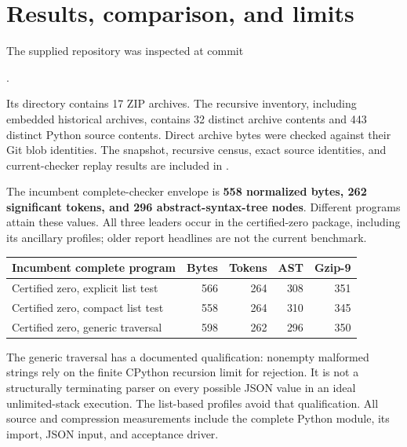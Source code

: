 \section{Results, comparison, and limits}
\label{sec:scope}

The supplied repository was inspected at commit
\begin{center}\small{}.\end{center}
Its  directory contains 17 ZIP archives. The recursive
inventory, including embedded historical archives, contains 32 distinct
archive contents and 443 distinct Python source contents. Direct archive
bytes were checked against their Git blob identities. The snapshot,
recursive census, exact source identities, and current-checker replay
results are included in .\cite{snapshot}

The incumbent complete-checker envelope is \textbf{558 normalized bytes,
262 significant tokens, and 296 abstract-syntax-tree nodes}. Different
programs attain these values. All three leaders occur in the
certified-zero package, including its ancillary profiles; older report
headlines are not the current benchmark.\cite{certified}

\begin{center}\small
\begin{tabular}{lrrrr}
\toprule
Incumbent complete program & Bytes & Tokens & AST & Gzip-9\\
\midrule
Certified zero, explicit list test &566&264&308&351\\
Certified zero, compact list test &558&264&310&345\\
Certified zero, generic traversal &598&262&296&350\\
\bottomrule
\end{tabular}
\end{center}

The generic traversal has a documented qualification: nonempty malformed
strings rely on the finite CPython recursion limit for rejection. It is
not a structurally terminating parser on every possible JSON value in an
ideal unlimited-stack execution. The list-based profiles avoid that
qualification. All source and compression measurements include the
complete Python module, its import, JSON input, and acceptance driver.


